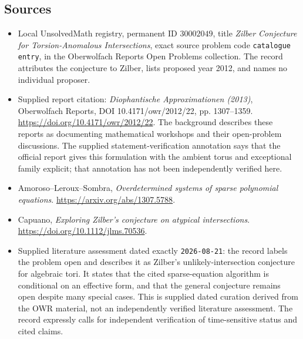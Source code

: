 \documentclass[11pt]{article}
\begin{document}
\subsection{Sources}
\begin{itemize}
\item Local UnsolvedMath registry, permanent ID \(30002049\), title \emph{Zilber Conjecture for Torsion-Anomalous Intersections}, exact source problem code \texttt{catalogue entry}, in the Oberwolfach Reports Open Problems collection. The record attributes the conjecture to Zilber, lists proposed year 2012, and names no individual proposer.
\item Supplied report citation: \emph{Diophantische Approximationen (2013)}, Oberwolfach Reports, DOI 10.4171/owr/2012/22, pp. 1307--1359. \url{https://doi.org/10.4171/owr/2012/22}. The background describes these reports as documenting mathematical workshops and their open-problem discussions. The supplied statement-verification annotation says that the official report gives this formulation with the ambient torus and exceptional family explicit; that annotation has not been independently verified here.
\item Amoroso--Leroux--Sombra, \emph{Overdetermined systems of sparse polynomial equations}. \url{https://arxiv.org/abs/1307.5788}.
\item Capuano, \emph{Exploring Zilber's conjecture on atypical intersections}. \url{https://doi.org/10.1112/jlms.70536}.
\item Supplied literature assessment dated exactly \texttt{2026-08-21}: the record labels the problem open and describes it as Zilber's unlikely-intersection conjecture for algebraic tori. It states that the cited sparse-equation algorithm is conditional on an effective form, and that the general conjecture remains open despite many special cases. This is supplied dated curation derived from the OWR material, not an independently verified literature assessment. The record expressly calls for independent verification of time-sensitive status and cited claims.
\end{itemize}
\end{document}
